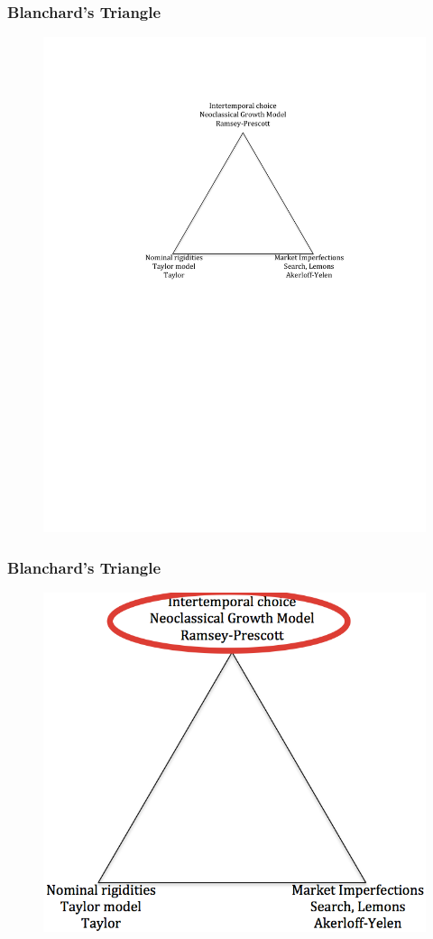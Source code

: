 \documentclass{beamer}
\begin{document}
\begin{frame}
\frametitle[alignment=center]{Blanchard's Triangle}
\begin{figure}
\centering
\includegraphics[scale=0.80]{BlanchardsTriangle-1.pdf}
\end{figure}
\end{frame}

\begin{frame}
\frametitle[alignment=center]{Blanchard's Triangle}
\begin{figure}
\centering
\includegraphics[scale=0.80]{BlanchardsTriangle-2.png}
\end{figure}
\end{frame}
\end{document}
